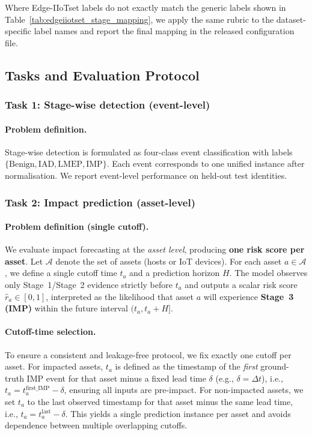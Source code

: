 \documentclass[pdflatex,sn-mathphys-num]{sn-jnl}
\theoremstyle{thmstyleone}%
\theoremstyle{thmstyletwo}%
\theoremstyle{thmstylethree}%
\begin{document}
Where Edge-IIoTset labels do not exactly match the generic labels shown in Table~\ref{tab:edgeiiotset_stage_mapping}, we apply the same rubric to the dataset-specific label names and report the final mapping in the released configuration file.

\color{black}

\subsection{Tasks and Evaluation Protocol}
\label{subsec:tasks_protocol}

\subsubsection{Task 1: Stage-wise detection (event-level)}
\label{subsubsec:task_stage_detection}

\paragraph{Problem definition.}
Stage-wise detection is formulated as four-class event classification with labels
$\{\text{Benign},\text{IAD},\text{LMEP},\text{IMP}\}$.
Each event corresponds to one unified instance after normalisation.
We report event-level performance on held-out test identities.

\subsubsection{Task 2: Impact prediction (asset-level)}
\label{subsubsec:task_impact_prediction}

\paragraph{Problem definition (single cutoff).}
We evaluate impact forecasting at the \emph{asset level}, producing \textbf{one risk score per asset}.
Let $\mathcal{A}$ denote the set of assets (hosts or IoT devices).
For each asset $a\in\mathcal{A}$, we define a single cutoff time $t_a$ and a prediction horizon $H$.
The model observes only Stage~1/Stage~2 evidence strictly before $t_a$ and outputs a scalar risk score
$\hat{r}_a \in [0,1]$, interpreted as the likelihood that asset $a$ will experience \textbf{Stage~3 (IMP)}
within the future interval $(t_a, t_a + H]$.

\paragraph{Cutoff-time selection.}
To ensure a consistent and leakage-free protocol, we fix exactly one cutoff per asset.
For impacted assets, $t_a$ is defined as the timestamp of the \emph{first} ground-truth IMP event for that asset
minus a fixed lead time $\delta$ (e.g., $\delta=\Delta t$), i.e.,
$t_a = t^{\mathrm{first\_IMP}}_a - \delta$, ensuring all inputs are pre-impact.
For non-impacted assets, we set $t_a$ to the last observed timestamp for that asset minus the same lead time, i.e.,
$t_a = t^{\mathrm{last}}_a - \delta$.
This yields a single prediction instance per asset and avoids dependence between multiple overlapping cutoffs.
\end{document}
